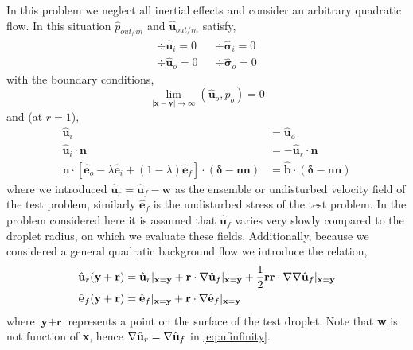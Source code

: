 In this problem we neglect all inertial effects and consider an arbitrary quadratic flow. 
In this situation $\hat{p}_{out/in}$ and $\hat{\textbf{u}}_{out/in}$ satisfy,
\begin{align}
    \div \hat{\textbf{u}}_{i} = 0 
    && \div\hat{\bm\sigma}_{i}  = 0 
    \label{eq:momentum_in_s}
    \\
    \div \hat{\textbf{u}}_{o} = 0 
    &&\div\hat{\bm\sigma}_{o}  = 0 
    \label{eq:momentum_out_s}
\end{align}
with the boundary conditions, 
\begin{equation}
    \lim_{|\textbf{x}-\textbf{y}|\to \infty}(\hat{\textbf{u}}_{o},p_{o}) = 0 
\end{equation}
and (at $r=1$),
\begin{align}
    \hat{\textbf{u}}_{i} &= \hat{\textbf{u}}_{o}\\
    \hat{\textbf{u}}_{i} \cdot \textbf{n} &= - \hat{\textbf{u}}_r \cdot \textbf{n}
    \label{eq:normal_vel_s}
    \\
    \mathbf{n}\cdot [\hat{\textbf{e}}_{o} - \lambda \hat{\textbf{e}}_{i} + (1-\lambda) \hat{\textbf{e}}_f
    ]\cdot (\bm\delta - \textbf{nn})
    &=
    \hat{\textbf{b}}\cdot (\bm\delta - \textbf{nn})
\end{align}
where we introduced $\hat{\textbf{u}}_r = \hat{\textbf{u}}_f - \textbf{w}$ as the ensemble or undisturbed velocity field of the test problem, similarly $\hat{\textbf{e}}_f$ is the undisturbed stress of the test problem. 
In the problem considered here it is assumed that $\hat{\textbf{u}}_f$ varies very slowly compared to the droplet radius, on which we evaluate these fields. 
Additionally, because we considered a general quadratic background flow we introduce the relation, 
\begin{align}
    \hat{\textbf{u}}_r(\textbf{y}+ \textbf{r}) 
    &=  \hat{\textbf{u}}_r|_{\textbf{x}=\textbf{y}}
    +  \textbf{r} \cdot  \grad\hat{\textbf{u}}_f|_{\textbf{x}=\textbf{y}}
    +  \frac{1}{2}\textbf{rr} \cdot  \grad\grad\hat{\textbf{u}}_f|_{\textbf{x}=\textbf{y}}
    \label{eq:ufinfinity}
    \\
    \hat{\textbf{e}}_f(\textbf{y}+\textbf{r})
    &=   
    \hat{\textbf{e}}_f|_{\textbf{x}=\textbf{y}}
    + \textbf{r} \cdot  \grad \hat{\textbf{e}}_f|_{\textbf{x}=\textbf{y}}
\end{align}
where $\textbf{y}+ \textbf{r}$ represents a point on the surface of the test droplet. 
Note that \textbf{w} is not function of \textbf{x}, hence $\mathbf{\nabla} \hat{\textbf{u}}_r = \mathbf{\nabla} \hat{\textbf{u}}_f$  in \ref{eq:ufinfinity}. 


